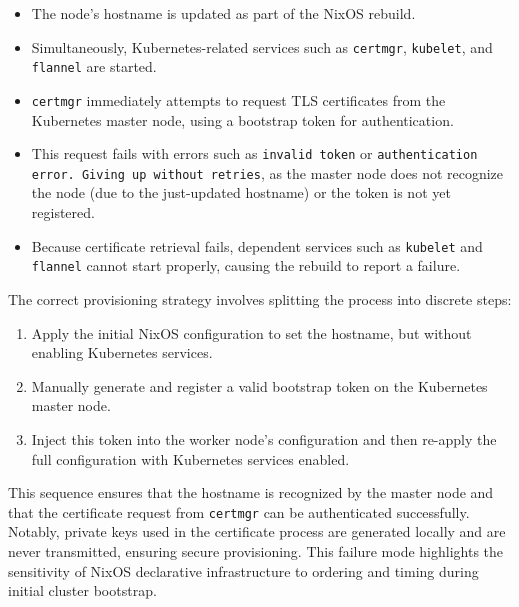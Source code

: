 \begin{itemize}
    \item The node's hostname is updated as part of the NixOS rebuild.
    \item Simultaneously, Kubernetes-related services such as \texttt{certmgr}, \texttt{kubelet}, and \texttt{flannel} are started.
    \item \texttt{certmgr} immediately attempts to request TLS certificates from the Kubernetes master node, using a bootstrap token for authentication.
    \item This request fails with errors such as \texttt{invalid token} or \texttt{authentication error. Giving up without retries}, as the master node does not recognize the node (due to the just-updated hostname) or the token is not yet registered.
    \item Because certificate retrieval fails, dependent services such as \texttt{kubelet} and \texttt{flannel} cannot start properly, causing the rebuild to report a failure.
\end{itemize}

The correct provisioning strategy involves splitting the process into discrete steps:

\begin{enumerate}
    \item Apply the initial NixOS configuration to set the hostname, but without enabling Kubernetes services.
    \item Manually generate and register a valid bootstrap token on the Kubernetes master node.
    \item Inject this token into the worker node's configuration and then re-apply the full configuration with Kubernetes services enabled.
\end{enumerate}

This sequence ensures that the hostname is recognized by the master node and that the certificate request from \texttt{certmgr} can be authenticated successfully. Notably, private keys used in the certificate process are generated locally and are never transmitted, ensuring secure provisioning. This failure mode highlights the sensitivity of NixOS declarative infrastructure to ordering and timing during initial cluster bootstrap.